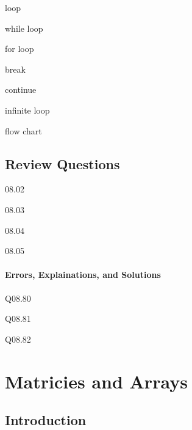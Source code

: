 \documentclass{book}
\newenvironment{problems}{}{}  %
\newenvironment{key_terms}{\begin{multicols}{3}}{\end{multicols}} %
\begin{document}
    
        \begin{key_terms}
        loop

while loop

for loop

break

continue

infinite loop

flow chart
        \end{key_terms}

    




    
        \section{Review Questions}\label{review-questions}
    




    
        \begin{problems}
        08.01

08.02

08.03

08.04

08.05
        \end{problems}

    




    
        \subsubsection{Errors, Explainations, and
Solutions}\label{errors-explainations-and-solutions}

Q08.80

Q08.81

Q08.82
    




    
        \chapter{Matricies and Arrays}\label{matricies-and-arrays}
    




    
        \section{Introduction}\label{introduction}
    
\end{document}
